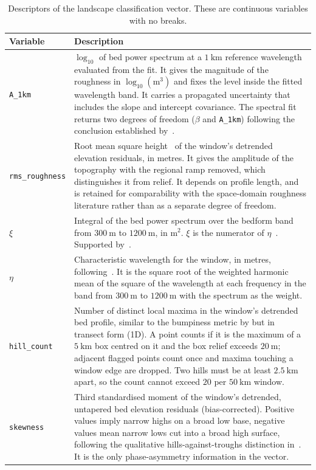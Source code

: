 \begin{table}
\centering
\caption{Descriptors of the landscape classification vector. These are continuous variables with no breaks.}
\label{tab:descriptors}
\begin{tabularx}{\textwidth}{p{4.0cm} X}
\toprule
\textbf{Variable} & \textbf{Description} \\
\midrule
  \texttt{A\_1km} & $\log_{10}$ of bed power spectrum at a $1~\mathrm{km}$ reference wavelength evaluated from the fit. It gives the magnitude of the roughness in $\log_{10}(\mathrm{m}^3)$ and fixes the level inside the fitted wavelength band. It carries a propagated uncertainty that includes the slope and intercept covariance. The spectral fit returns two degrees of freedom ($\beta$ and \texttt{A\_1km}) following the conclusion established by~\cite{Li_2010, Jordan_2017, Rippin_2014}. \\
  \addlinespace[0.5em]
  \texttt{rms\_roughness} & Root mean square height~\cite{Shepard_1995} of the window's detrended elevation residuals, in metres. It gives the amplitude of the topography with the regional ramp removed, which distinguishes it from relief. It depends on profile length, and is retained for comparability with the space-domain roughness literature rather than as a separate degree of freedom. \\
  \addlinespace[0.5em]
  $\xi$ & Integral of the bed power spectrum over the bedform band from $300~\mathrm{m}$ to $1200~\mathrm{m}$, in $\mathrm{m^2}$. $\xi$ is the numerator of $\eta$~\cite{Li_2010}. Supported by~\cite{King_2007, Spagnolo_2017}. \\
  \addlinespace[0.5em]
  $\eta$ & Characteristic wavelength for the window, in metres, following~\cite{Li_2010}. It is the square root of the weighted harmonic mean of the square of the wavelength at each frequency in the band from $300~\mathrm{m}$ to $1200~\mathrm{m}$ with the spectrum as the weight. \\
  \addlinespace[0.5em]
  \texttt{hill\_count} & Number of distinct local maxima in the window's detrended bed profile, similar to the bumpiness metric by \cite{Ockenden_2026} but in transect form (1D). A point counts if it is the maximum of a $5~\mathrm{km}$ box centred on it and the box relief exceeds $20~\mathrm{m}$; adjacent flagged points count once and maxima touching a window edge are dropped. Two hills must be at least $2.5~\mathrm{km}$ apart, so the count cannot exceed $20$ per $50~\mathrm{km}$ window. \\
  \addlinespace[0.5em]
  \texttt{skewness} & Third standardised moment of the window's detrended, untapered bed elevation residuals (bias-corrected). Positive values imply narrow highs on a broad low base, negative values mean narrow lows cut into a broad high surface, following the qualitative hills-against-troughs distinction in~\cite{Sugden_1978}. It is the only phase-asymmetry information in the vector.\\

\end{tabularx}
\end{table}
